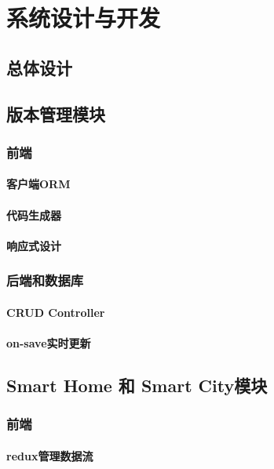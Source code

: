 
\chapter{系统设计与开发}
\label{chap:design_and_implement}

\section{总体设计}
\section{版本管理模块}
\subsection{前端}
\subsubsection{客户端ORM}
\subsubsection{代码生成器}
\subsubsection{响应式设计}
\subsection{后端和数据库}
\subsubsection{CRUD Controller}
\subsubsection{on-save实时更新}
\section{Smart Home 和 Smart City模块}
\subsection{前端}
\subsubsection{redux管理数据流}
